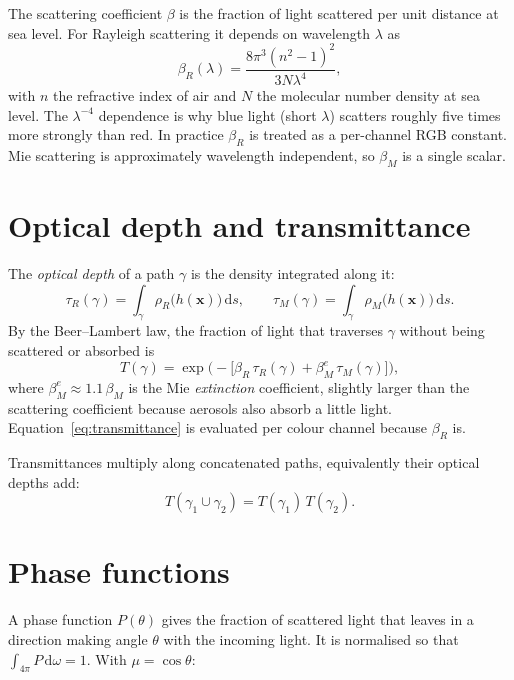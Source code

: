 \documentclass[11pt]{article}
\newcommand{\vect}[1]{\mathbf{#1}}
\newcommand{\dd}{\,\mathrm{d}}
\begin{document}
The scattering coefficient $\beta$ is the fraction of light scattered per unit
distance at sea level. For Rayleigh scattering it depends on wavelength
$\lambda$ as
\begin{equation}
  \beta_R(\lambda) = \frac{8\pi^3 \left(n^2 - 1\right)^2}{3 N \lambda^4},
  \label{eq:beta_rayleigh}
\end{equation}
with $n$ the refractive index of air and $N$ the molecular number density at
sea level. The $\lambda^{-4}$ dependence is why blue light (short $\lambda$)
scatters roughly five times more strongly than red. In practice $\beta_R$ is
treated as a per-channel RGB constant. Mie scattering is approximately
wavelength independent, so $\beta_M$ is a single scalar.

\section{Optical depth and transmittance}

The \emph{optical depth} of a path $\gamma$ is the density integrated along it:
\begin{equation}
  \tau_R(\gamma) = \int_\gamma \rho_R\big(h(\vect{x})\big) \dd s, \qquad
  \tau_M(\gamma) = \int_\gamma \rho_M\big(h(\vect{x})\big) \dd s .
  \label{eq:optical_depth}
\end{equation}
By the Beer--Lambert law, the fraction of light that traverses $\gamma$ without
being scattered or absorbed is
\begin{equation}
  T(\gamma) = \exp\!\Big( -\big[\beta_R \, \tau_R(\gamma) + \beta_M^{e} \, \tau_M(\gamma)\big] \Big),
  \label{eq:transmittance}
\end{equation}
where $\beta_M^{e} \approx 1.1\,\beta_M$ is the Mie \emph{extinction}
coefficient, slightly larger than the scattering coefficient because aerosols
also absorb a little light. Equation~\eqref{eq:transmittance} is evaluated per
colour channel because $\beta_R$ is.

Transmittances multiply along concatenated paths, equivalently their optical
depths add:
\begin{equation}
  T(\gamma_1 \cup \gamma_2) = T(\gamma_1)\,T(\gamma_2).
  \label{eq:multiply}
\end{equation}

\section{Phase functions}

A phase function $P(\theta)$ gives the fraction of scattered light that leaves
in a direction making angle $\theta$ with the incoming light. It is normalised
so that $\int_{4\pi} P \dd\omega = 1$. With $\mu = \cos\theta$:
\end{document}
